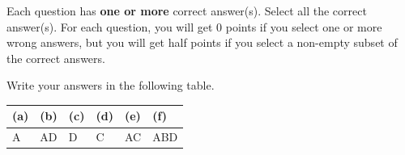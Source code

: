 
Each question has \textbf{one or more} correct answer(s). Select all the correct answer(s). For each question, you will get 0 points if you select one or more wrong answers, but you will get half points if you select a non-empty subset of the correct answers.

Write your answers in the following table.


\begin{table}[h]
    \centering
    \renewcommand{\arraystretch}{1.25}
    \begin{tabular}{|p{2cm}|p{2cm}|p{2cm}|p{2cm}|p{2cm}|p{2cm}|}
        \hline 
        (a) & (b) & (c) & (d) & (e) & (f) \\
        \hline
        A& AD & D & C & AC & ABD \\

        \hline
    \end{tabular} 
\end{table}

